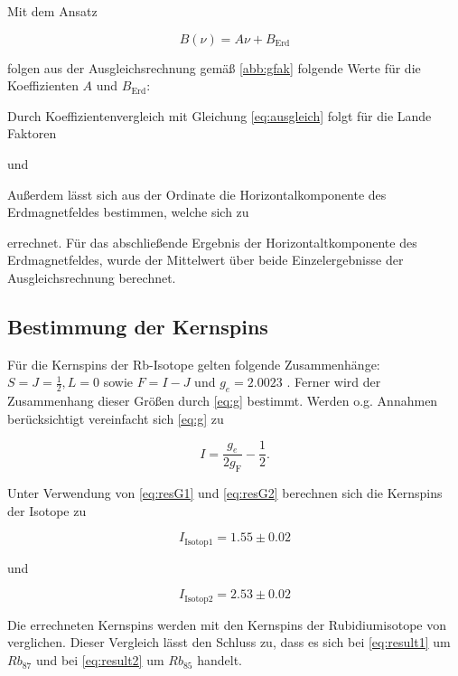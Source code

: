 Mit dem Ansatz

\begin{equation}
B(\nu) = A\nu + B_\text{Erd}
\end{equation}

folgen aus der Ausgleichsrechnung gemäß \autoref{abb:gfak} folgende Werte für die Koeffizienten $A$ und $B_\text{Erd}$:



Durch Koeffizientenvergleich mit Gleichung \ref{eq:ausgleich} folgt für die Lande Faktoren



und



Außerdem lässt sich aus der Ordinate die Horizontalkomponente des Erdmagnetfeldes bestimmen,
welche sich zu



errechnet. Für das abschließende Ergebnis der Horizontaltkomponente des Erdmagnetfeldes, wurde der Mittelwert über beide Einzelergebnisse der Ausgleichsrechnung berechnet.

\subsection{Bestimmung der Kernspins}
Für die Kernspins der Rb-Isotope gelten folgende Zusammenhänge: $S = J = \frac{1}{2} , L = 0$ sowie $F = I - J$ und $g_e = 2.0023$ \cite{landeE-}. Ferner wird
der Zusammenhang dieser Größen durch \autoref{eq:g} bestimmt. Werden o.g. Annahmen berücksichtigt vereinfacht sich \autoref{eq:g} zu

\begin{equation}
I = \frac{g_e}{2g_\text{F}} - \frac{1}{2}.
\end{equation}

Unter Verwendung von \autoref{eq:resG1} und \autoref{eq:resG2} berechnen sich die Kernspins der Isotope zu

\begin{equation}
I_\text{Isotop1} = 1.55 \pm 0.02 
\label{eq:result1}
\end{equation}

und

\begin{equation}
I_\text{Isotop2} = 2.53 \pm 0.02
\label{eq:result2}
\end{equation}

Die errechneten Kernspins werden mit den Kernspins der Rubidiumisotope von \cite{coreSpin} verglichen. Dieser Vergleich lässt den Schluss zu,
dass es sich bei \ref{eq:result1} um $Rb_{87}$ und bei \ref{eq:result2} um $Rb_{85}$ handelt.

